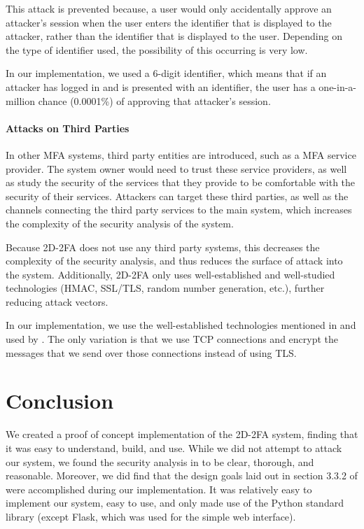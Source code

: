 \documentclass[11pt]{article}
\begin{document}
This attack is prevented because, a user would only accidentally approve
an attacker's session when the user enters the identifier that is
displayed to the attacker, rather than the identifier that is displayed
to the user. Depending on the type of identifier used, the possibility
of this occurring is very low.

In our implementation, we used a 6-digit identifier, which means that if
an attacker has logged in and is presented with an identifier, the user
has a one-in-a-million chance (0.0001\%) of approving that attacker's
session. 

\paragraph{Attacks on Third Parties}
In other MFA systems, third party entities are introduced, such as a MFA
service provider. The system owner would need to trust these service
providers, as well as study the security of the services that they
provide to be comfortable with the security of their services. Attackers
can target these third parties, as well as the channels connecting the
third party services to the main system, which increases the complexity
of the security analysis of the system. 

Because 2D-2FA does not use any third party systems, this decreases the
complexity of the security analysis, and thus reduces the surface of
attack into the system. Additionally, 2D-2FA only uses well-established
and well-studied technologies (HMAC, SSL/TLS, random number generation,
etc.), further reducing attack vectors.

In our implementation, we use the well-established technologies
mentioned in and used by \cite{shirvanian2d2fa}. The only variation is
that we use TCP connections and encrypt the messages
that we send over those connections instead of using TLS.

\section{Conclusion}

We created a proof of concept implementation of the 2D-2FA system,
finding that it was easy to understand, build, and use. While we did not
attempt to attack our system, we found the security analysis in
\cite{shirvanian2d2fa} to be clear, thorough, and reasonable. Moreover,
we did find that the design goals laid out in section 3.3.2 of
\cite{shirvanian2d2fa} were accomplished during our implementation. It
was relatively easy to implement our system, easy to use, and only made
use of the Python standard library (except Flask, which was used for the
simple web interface). 
\end{document}
